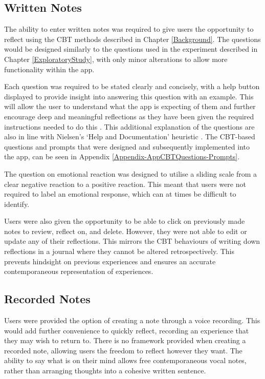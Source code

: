 \documentclass{l4proj}
\begin{document}
\subsection{Written Notes}

The ability to enter written notes was required to give users the opportunity to reflect using the CBT methods described in Chapter \ref{Background}. The questions would be designed similarly to the questions used in the experiment described in Chapter \ref{ExploratoryStudy}, with only minor alterations to allow more functionality within the app. 

Each question was required to be stated clearly and concisely, with a help button displayed to provide insight into answering this question with an example. This will allow the user to understand what the app is expecting of them and further encourage deep and meaningful reflections as they have been given the required instructions needed to do this \citep{bruno_reflective_2018}. This additional explanation of the questions are also in line with Nielsen’s ‘Help and Documentation’ heuristic \citep{Nielsen10}. The CBT-based questions and prompts that were designed and subsequently implemented into the app, can be seen in Appendix \ref{Appendix-AppCBTQuestions-Prompts}.

The question on emotional reaction was designed to utilise a sliding scale from a clear negative reaction to a positive reaction. This meant that users were not required to label an emotional response, which can at times be difficult to identify. 

Users were also given the opportunity to be able to click on previously made notes to review, reflect on, and delete. However, they were not able to edit or update any of their reflections. This mirrors the CBT behaviours of writing down reflections in a journal where they cannot be altered retrospectively. This prevents hindsight on previous experiences and ensures an accurate contemporaneous representation of experiences.


\subsection{Recorded Notes}

Users were provided the option of creating a note through a voice recording. This would add further convenience to quickly reflect, recording an experience that they may wish to return to. There is no framework provided when creating a recorded note, allowing users the freedom to reflect however they want. The ability to say what is on their mind allows free contemporaneous vocal notes, rather than arranging thoughts into a cohesive written sentence.
\end{document}

